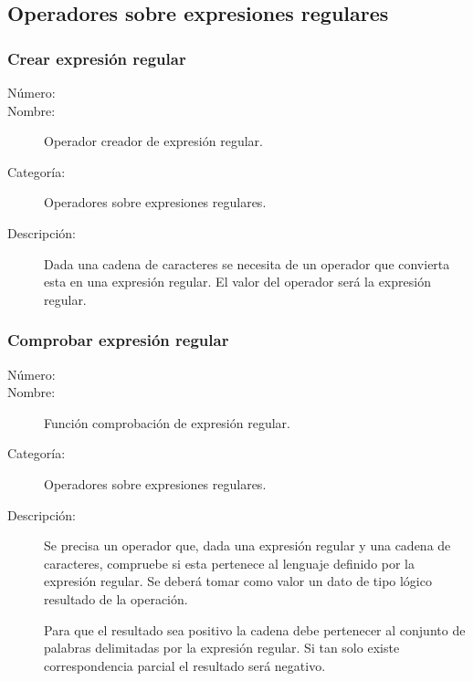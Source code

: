 \subsection{Operadores sobre expresiones regulares}

\subsubsection{Crear expresión regular}
	\begin{description}
		\item [Número:] \cn
		\item [Nombre:] Operador creador de expresión regular.
		\item [Categoría:] Operadores sobre expresiones regulares.
		\item [Descripción:] Dada una cadena de caracteres se necesita de un operador que convierta esta en una expresión regular. El
		valor del operador será la expresión regular.
	\end {description}

\subsubsection{Comprobar expresión regular}
	\begin{description}
		\item [Número:] \cn
		\item [Nombre:] Función comprobación de expresión regular.
		\item [Categoría:] Operadores sobre expresiones regulares.
		\item [Descripción:] Se precisa un operador que, dada una expresión regular y una cadena de caracteres,
		compruebe si esta pertenece al lenguaje definido por la expresión regular. Se
		deberá tomar como valor un dato de tipo lógico resultado de la operación.
		
		Para que el resultado sea positivo la cadena debe pertenecer al conjunto de palabras delimitadas
		por la expresión regular. Si tan solo existe correspondencia parcial el resultado será negativo.
	\end {description}

